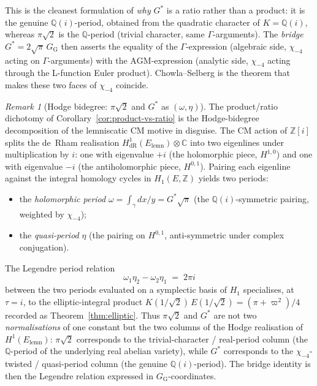 \documentclass[11pt]{article}
\theoremstyle{definition}
\theoremstyle{remark}
\newtheorem*{remark}{Remark}
\newcommand{\Gs}{G^{*}}
\newcommand{\GG}{G_{\!\scriptscriptstyle\mathrm{G}}}
\newcommand{\Z}{\mathbb{Z}}
\newcommand{\Q}{\mathbb{Q}}
\newcommand{\C}{\mathbb{C}}
\newcommand{\AGM}{\mathrm{AGM}}
\begin{document}
This is the cleanest formulation of \emph{why} $\Gs$ is a ratio rather
than a product: it is the genuine $\Q(i)$-period, obtained from the
quadratic character of $K = \Q(i)$, whereas $\pi\sqrt 2$ is the
$\Q$-period (trivial character, same $\Gamma$-arguments). The
\emph{bridge} $\Gs = 2\sqrt\pi\,\GG$ then asserts the equality of the
$\Gamma$-expression (algebraic side, $\chi_{-4}$ acting on $\Gamma$-arguments)
with the $\AGM$-expression (analytic side, $\chi_{-4}$ acting through
the L-function Euler product). Chowla--Selberg is the theorem that
makes these two faces of $\chi_{-4}$ coincide.

\begin{remark}[Hodge bidegree: $\pi\sqrt 2$ and $\Gs$ as $(\omega, \eta)$]\label{rem:hodge-bidegree}
The product/ratio dichotomy of Corollary~\ref{cor:product-vs-ratio} is
the Hodge-bidegree decomposition of the lemniscatic CM motive in
disguise. The CM action of $\Z[i]$ splits the de~Rham realisation
$H^{1}_{\mathrm{dR}}(E_{\mathrm{lemn}}) \otimes \C$ into two eigenlines
under multiplication by $i$: one with eigenvalue $+i$ (the holomorphic
piece, $H^{1, 0}$) and one with eigenvalue $-i$ (the antiholomorphic
piece, $H^{0, 1}$). Pairing each eigenline against the integral homology
cycles in $H_{1}(E, \Z)$ yields two periods:
\begin{itemize}[leftmargin=*, itemsep=2pt]
\item the \emph{holomorphic period} $\omega = \int_\gamma dx/y = \Gs\sqrt{\pi}$
(the $\Q(i)$-symmetric pairing, weighted by $\chi_{-4}$);
\item the \emph{quasi-period} $\eta$ (the pairing on $H^{0,1}$, anti-symmetric
under complex conjugation).
\end{itemize}
The Legendre period relation
\[
\omega_1 \eta_2 - \omega_2 \eta_1 \;=\; 2\pi i
\]
between the two periods evaluated on a symplectic basis of $H_{1}$
specialises, at $\tau = i$, to the elliptic-integral product
$K(1/\sqrt 2)\,E(1/\sqrt 2) = (\pi + \varpi^{2})/4$ recorded as
Theorem~\ref{thm:elliptic}. Thus $\pi\sqrt 2$ and $\Gs$ are not two
\emph{normalisations} of one constant but the two columns of the Hodge
realisation of $H^{1}(E_{\mathrm{lemn}})$: $\pi\sqrt 2$ corresponds to
the trivial-character / real-period column (the $\Q$-period of the
underlying real abelian variety), while $\Gs$ corresponds to the
$\chi_{-4}$-twisted / quasi-period column (the genuine $\Q(i)$-period).
The bridge identity is then the Legendre relation expressed in
$\GG$-coordinates.
\end{remark}
\end{document}
